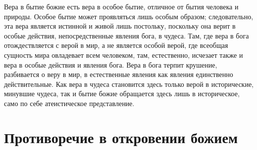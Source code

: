 \documentclass[12pt,oneside]{book}
\begin{document}
Вера в бытие божие есть вера в особое бытие, отличное от бытия человека и природы. Особое бытие может проявляться лишь особым образом; следовательно, эта вера является истинной и живой лишь постольку, поскольку она верит в особые действия, непосредственные явления бога, в чудеса. Там, где вера в бога отождествляется с верой в мир, а не является особой верой, где всеобщая сущность мира овладевает всем человеком, там, естественно, исчезает также и вера в особые действия и явления бога. Вера в бога терпит крушение, разбивается о веру в мир, в естественные явления как явления единственно действительные. Как вера в чудеса становится здесь только верой в исторические, минувшие чудеса, так и бытие божие обращается здесь лишь в историческое, само по себе атеистическое представление.





\chapter{Противоречие в откровении божием}
\end{document}
